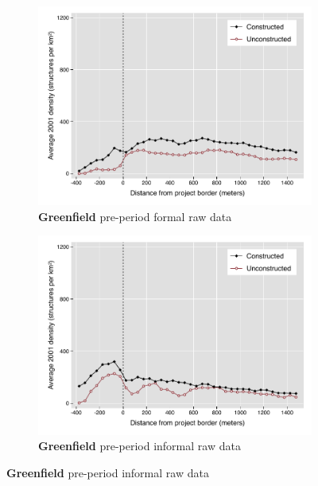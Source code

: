 \documentclass[12pt]{article}
\begin{document}
\begin{figure}
\begin{subfigure}[b]{0.48\textwidth}
        \end{subfigure}
        \begin{subfigure}[b]{0.48\textwidth}
                    \caption[Network2]%
            {{\footnotesize \textbf{Greenfield} pre-period formal  raw data}}    
            \label{fig:prefor}
            \centering
            \includegraphics[width=\textwidth,trim={0.3cm .3cm 0.1cm 0cm}, clip=true]{figures/bblu_for_pre_means_4_1_30k.pdf}

        \end{subfigure}
        \hfill
        \begin{subfigure}[b]{0.48\textwidth}  
                    \caption[]%
            {{\footnotesize \textbf{Greenfield} pre-period informal  raw data}}     
            \label{fig:preinf}
            \centering 
            \includegraphics[width=\textwidth,trim={0.3cm .3cm 0.1cm 0cm}, clip=true]{figures/bblu_inf_pre_means_4_1_30k.pdf}


\end{subfigure}
\end{figure}
\end{document}

